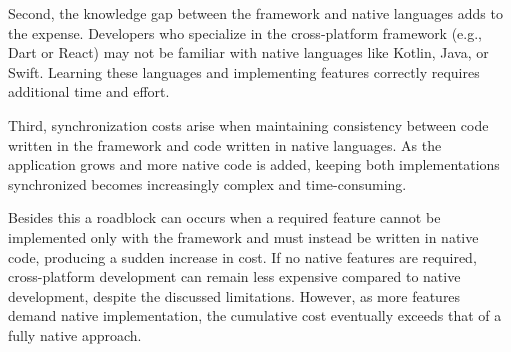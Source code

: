 Second, the knowledge gap between the framework and native languages adds to the expense. Developers who specialize in the cross-platform framework (e.g., Dart or React) may not be familiar with native languages like Kotlin, Java, or Swift. Learning these languages and implementing features correctly requires additional time and effort.

Third, synchronization costs arise when maintaining consistency between code written in the framework and code written in native languages. As the application grows and more native code is added, keeping both implementations synchronized becomes increasingly complex and time-consuming.\cite{Nagy2022}

Besides this a roadblock can occurs when a required feature cannot be implemented only with the framework and must instead be written in native code, producing a sudden increase in cost. If no native features are required, cross-platform development can remain less expensive compared to native development, despite the discussed limitations.
However, as more features demand native implementation, the cumulative cost eventually exceeds that of a fully native approach.\cite{Nagy2022}

